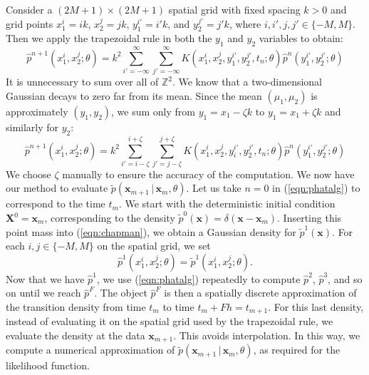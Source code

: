 \documentclass[graybox]{svmult}
\begin{document}
Consider a $(2M+1) \times (2M+1)$ spatial grid with fixed spacing $k > 0$ and grid points $x_1^i = ik$, $x_2^j = jk$, $y_1^{i'} = i'k$, and $y_2^{j'} = j'k$, where $i, i', j, j' \in \{-M, M\}$. Then we apply the trapezoidal rule in both the $y_1$ and $y_2$ variables to obtain:
\begin{equation}
\hat{p}^{n+1}(x_1^i, x_2^j ;\theta) = k^2 \sum\limits_{i' = -\infty}^{\infty} \sum\limits_{j' = -\infty}^{\infty} K(x_1^i, x_2^j, y_1^{i'}, y_2^{j'},t_n; \theta)  \hat{p}^n(y_1^{i'}, y_2^{j'}; \theta)
\end{equation}
It is unnecessary to sum over all of $\mathbb{Z}^2$.  We know that a two-dimensional Gaussian decays to zero far from its mean.  Since the mean $(\mu_1,\mu_2)$ is approximately $(y_1,y_2)$, we sum only from $y_1 = x_1 - \zeta k$ to $y_1 = x_1 + \zeta k$ and similarly for $y_2$:
\begin{equation}
\label{eqn:phatalg}
\hat{p}^{n+1}(x_1^i, x_2^j;\theta ) = k^2 \sum\limits_{i' = i - \zeta}^{i+ \zeta} \sum\limits_{j' = j-\zeta}^{j+\zeta} K(x_1^i, x_2^j, y_i^{i'}, y_2^{j'},t_n; \theta) \hat{p}^n(y_1^{i'}, y_2^{j'}; \theta)
\end{equation}
We choose $\zeta$ manually to ensure the accuracy of the computation.
We now have our method to evaluate $\widetilde{p}(\mathbf{x}_{m+1} \, | \, \mathbf{x}_m, \theta)$.  Let us take $n=0$ in (\ref{eqn:phatalg}) to correspond to the time $t_m$.  We start with the deterministic initial condition $\mathbf{X}^0 = \mathbf{x}_m$, corresponding to the density $\widetilde{p}^0(\mathbf{x}) = \delta(\mathbf{x} - \mathbf{x}_m)$.  Inserting this point mass into (\ref{eqn:chapman}), we obtain a Gaussian density for $\widetilde{p}^1(\mathbf{x})$.  For each $i,j \in \{-M, M\}$ on the spatial grid, we set
$$
\hat{p}^1(x_1^i, x_2^j; \theta) = \widetilde{p}^1(x_1^i, x_2^j; \theta).
$$
Now that we have $\hat{p}^1$, we use (\ref{eqn:phatalg}) repeatedly to
compute $\hat{p}^2$, $\hat{p}^3$, and so on until we reach
$\hat{p}^F$.  The object $\hat{p}^F$ is then a spatially discrete
approximation of the transition density from time $t_m$ to time $t_m +
Fh = t_{m+1}$.  For this last density, instead of evaluating it on the
spatial grid used by the trapezoidal rule, we evaluate the density at
the data $\mathbf{x}_{m+1}$.  This avoids interpolation.  In this way,
we compute a numerical approximation of $\widetilde{p}(\mathbf{x}_{m+1} \, | \, \mathbf{x}_m, \theta)$, as required for the likelihood function.
\end{document}

